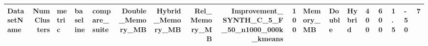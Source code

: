 \begin{tabular}{lrlllrrrrr}
\toprule
DatasetName & NumClusters & metric & baseline & compare_suite & Double_Memory_MB & Hybrid_Memory_MB & Rel_Memory_MB & Improvement_%
\midrule
SYNTH_C_5_F_50_n1000_000k_kmeans & 100 & Memory_MB & Double & Hybrid & 400 & 600 & 1.5 & -50 & 7 \\
\bottomrule
\end{tabular}
